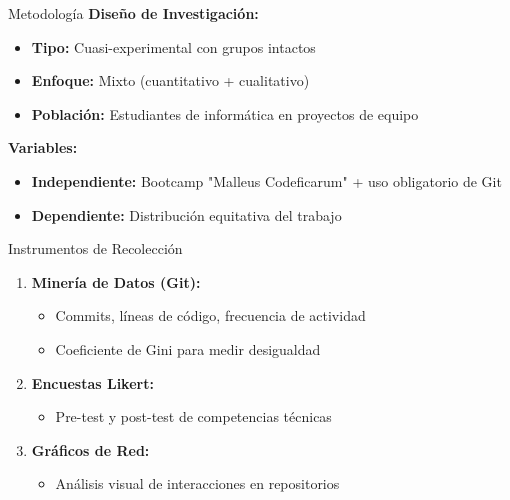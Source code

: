 \documentclass[t]{beamer}
\begin{document}
\begin{frame}{Metodología}
    \textbf{Diseño de Investigación:}
    \begin{itemize}
        \item \textbf{Tipo:} Cuasi-experimental con grupos intactos
        \item \textbf{Enfoque:} Mixto (cuantitativo + cualitativo)
        \item \textbf{Población:} Estudiantes de informática en proyectos de equipo
    \end{itemize}
    
    \vspace{0.5cm}
    
    \textbf{Variables:}
    \begin{itemize}
        \item \textbf{Independiente:} Bootcamp "Malleus Codeficarum" + uso obligatorio de Git
        \item \textbf{Dependiente:} Distribución equitativa del trabajo
    \end{itemize}
\end{frame}

\begin{frame}{Instrumentos de Recolección}
    \begin{enumerate}
        \item \textbf{Minería de Datos (Git):}
        \begin{itemize}
            \item Commits, líneas de código, frecuencia de actividad
            \item Coeficiente de Gini para medir desigualdad
        \end{itemize}
        
        \vspace{0.3cm}
        
        \item \textbf{Encuestas Likert:}
        \begin{itemize}
            \item Pre-test y post-test de competencias técnicas
        \end{itemize}
        
        \vspace{0.3cm}
        
        \item \textbf{Gráficos de Red:}
        \begin{itemize}
            \item Análisis visual de interacciones en repositorios
        \end{itemize}
    \end{enumerate}
\end{frame}
\end{document}
